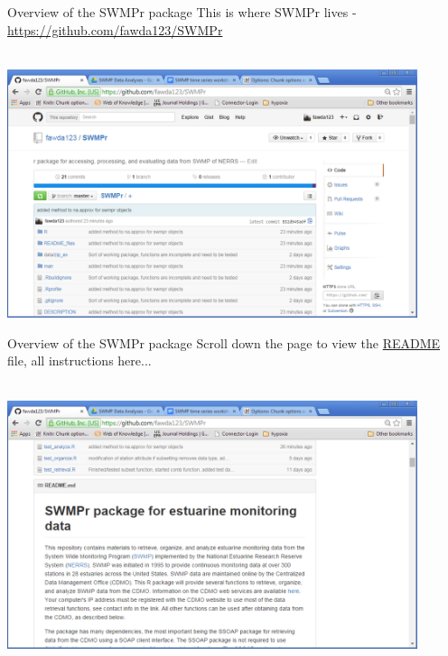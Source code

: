 \documentclass[xcolor=svgnames]{beamer}\usepackage[]{graphicx}\usepackage[]{color}
\begin{document}
\begin{frame}{Overview of the SWMPr package}
This is where SWMPr lives - \href{https://github.com/fawda123/SWMPr}{https://github.com/fawda123/SWMPr}\\~\\
\centerline{\includegraphics[width = 0.9\textwidth]{swmpr_github.png}}
\end{frame}

\begin{frame}{Overview of the SWMPr package}
Scroll down the page to view the \href{https://github.com/fawda123/SWMPr/blob/master/README.md}{README} file, all instructions here...\\~\\
\centerline{\includegraphics[width = 0.9\textwidth]{swmpr_readme.png}}
\end{frame}
\end{document}
